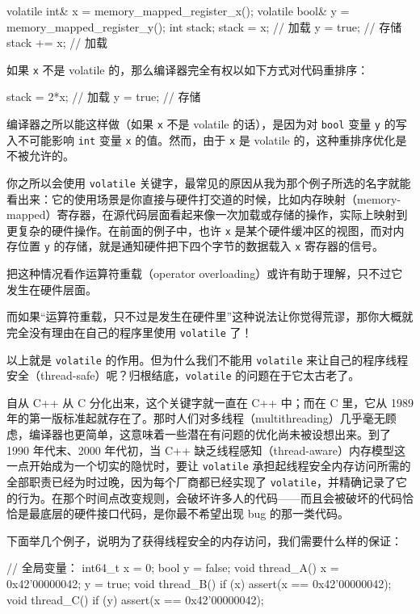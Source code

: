 \begin{codebox}[cpp]
    volatile int& x = memory_mapped_register_x();
    volatile bool& y = memory_mapped_register_y();
    int stack;
    stack = x; // 加载
    y = true; // 存储
    stack += x; // 加载
\end{codebox}

如果 \texttt{x} 不是 volatile 的，那么编译器完全有权以如下方式对代码重排序：

\begin{codebox}[cpp]
    stack = 2*x; // 加载
    y = true; // 存储
\end{codebox}

编译器之所以能这样做（如果 \texttt{x} 不是 volatile 的话），是因为对 \texttt{bool} 变量 \texttt{y} 的写入不可能影响 \texttt{int} 变量 \texttt{x} 的值。然而，由于 \texttt{x} 是 volatile 的，这种重排序优化是不被允许的。

你之所以会使用 \texttt{volatile} 关键字，最常见的原因从我为那个例子所选的名字就能看出来：它的使用场景是你直接与硬件打交道的时候，比如内存映射（memory-mapped）寄存器，在源代码层面看起来像一次加载或存储的操作，实际上映射到更复杂的硬件操作。在前面的例子中，也许 \texttt{x} 是某个硬件缓冲区的视图，而对内存位置 \texttt{y} 的存储，就是通知硬件把下四个字节的数据载入 \texttt{x} 寄存器的信号。

把这种情况看作运算符重载（operator overloading）或许有助于理解，只不过它发生在硬件层面。

而如果“运算符重载，只不过是发生在硬件里”这种说法让你觉得荒谬，那你大概就完全没有理由在自己的程序里使用 \texttt{volatile} 了！

以上就是 \texttt{volatile} 的作用。但为什么我们不能用 \texttt{volatile} 来让自己的程序线程安全（thread-safe）呢？归根结底，\texttt{volatile} 的问题在于它太古老了。

自从 C++ 从 C 分化出来，这个关键字就一直在 C++ 中；而在 C 里，它从 1989 年的第一版标准起就存在了。那时人们对多线程（multithreading）几乎毫无顾虑，编译器也更简单，这意味着一些潜在有问题的优化尚未被设想出来。到了 1990 年代末、2000 年代初，当 C++ 缺乏线程感知（thread-aware）内存模型这一点开始成为一个切实的隐忧时，要让 \texttt{volatile} 承担起线程安全内存访问所需的全部职责已经为时过晚，因为每个厂商都已经实现了 \texttt{volatile}，并精确记录了它的行为。在那个时间点改变规则，会破坏许多人的代码——而且会被破坏的代码恰恰是最底层的硬件接口代码，是你最不希望出现 bug 的那一类代码。

下面举几个例子，说明为了获得线程安全的内存访问，我们需要什么样的保证：

\begin{codebox}[cpp]
    // 全局变量：
    int64_t x = 0;
    bool y = false;
    void thread_A() {
      x = 0x42'00000042;
      y = true;
    }
    void thread_B() {
      if (x) {
        assert(x == 0x42'00000042);
      }
    }
    void thread_C() {
      if (y) {
        assert(x == 0x42'00000042);
      }
    }
\end{codebox}


